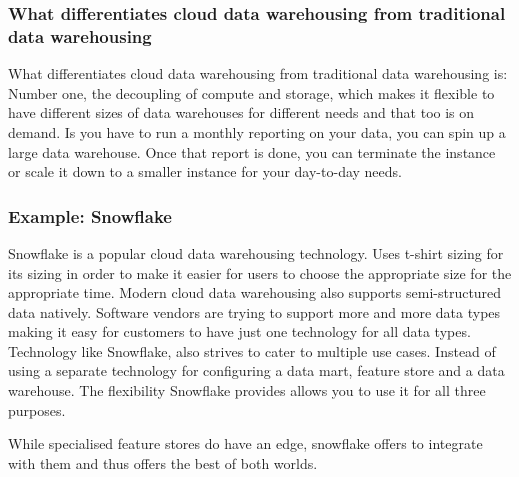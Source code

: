 \subsubsection{What differentiates cloud data warehousing from traditional data warehousing}
What differentiates cloud data warehousing from traditional data warehousing is:
Number one, the decoupling of compute and storage, which makes it flexible to have different sizes of data warehouses for different needs and that too is on demand.
Is you have to run a monthly reporting on your data, you can spin up a large data warehouse.
Once that report is done, you can terminate the instance or scale it down to a smaller instance for your day-to-day needs.

\subsubsection{Example: Snowflake}
Snowflake is a popular cloud data warehousing technology.
Uses t-shirt sizing for its sizing in order to make it easier for users to choose the appropriate size for the appropriate time.
Modern cloud data warehousing also supports semi-structured data natively.
Software vendors are trying to support more and more data types making it easy for customers to have just one technology for all data types.
Technology like Snowflake, also strives to cater to multiple use cases.
Instead of using a separate technology for configuring a data mart, feature store and a data warehouse.
The flexibility Snowflake provides allows you to use it for all three purposes.

While specialised feature stores do have an edge, snowflake offers to integrate with them and thus offers the best of both worlds.